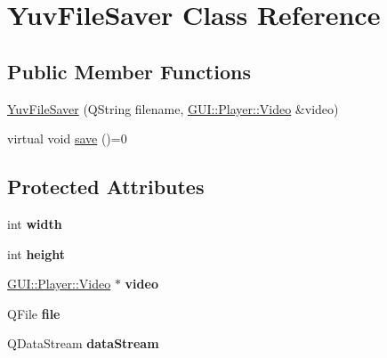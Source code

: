 \hypertarget{classGUI_1_1Player_1_1YuvFileSaver}{}\section{Yuv\+File\+Saver Class Reference}
\label{classGUI_1_1Player_1_1YuvFileSaver}
\subsection*{Public Member Functions}
\begin{DoxyCompactItemize}
\item 
\hyperlink{classGUI_1_1Player_1_1YuvFileSaver_ac26737451152f17475d0409ccd7698a1}{Yuv\+File\+Saver} (Q\+String filename, \hyperlink{classGUI_1_1Player_1_1Video}{G\+U\+I\+::\+Player\+::\+Video} \&video)
\item 
virtual void \hyperlink{classGUI_1_1Player_1_1YuvFileSaver_a710cb29afe2cd3d97a312f61140af200}{save} ()=0
\end{DoxyCompactItemize}
\subsection*{Protected Attributes}
\begin{DoxyCompactItemize}
\item 
\hypertarget{classGUI_1_1Player_1_1YuvFileSaver_a2474a5474cbff19523a51eb1de01cda4}{}int {\bfseries width}\label{classGUI_1_1Player_1_1YuvFileSaver_a2474a5474cbff19523a51eb1de01cda4}

\item 
\hypertarget{classGUI_1_1Player_1_1YuvFileSaver_ad12fc34ce789bce6c8a05d8a17138534}{}int {\bfseries height}\label{classGUI_1_1Player_1_1YuvFileSaver_ad12fc34ce789bce6c8a05d8a17138534}

\item 
\hypertarget{classGUI_1_1Player_1_1YuvFileSaver_ac39cb6d0a56308ca6323374fc0d74c96}{}\hyperlink{classGUI_1_1Player_1_1Video}{G\+U\+I\+::\+Player\+::\+Video} $\ast$ {\bfseries video}\label{classGUI_1_1Player_1_1YuvFileSaver_ac39cb6d0a56308ca6323374fc0d74c96}

\item 
\hypertarget{classGUI_1_1Player_1_1YuvFileSaver_a74a949f8555712ca2e528cf69d0d7f68}{}Q\+File {\bfseries file}\label{classGUI_1_1Player_1_1YuvFileSaver_a74a949f8555712ca2e528cf69d0d7f68}

\item 
\hypertarget{classGUI_1_1Player_1_1YuvFileSaver_a76868f3c583ad31447f724a6dcce0a8a}{}Q\+Data\+Stream {\bfseries data\+Stream}\label{classGUI_1_1Player_1_1YuvFileSaver_a76868f3c583ad31447f724a6dcce0a8a}

\end{DoxyCompactItemize}


